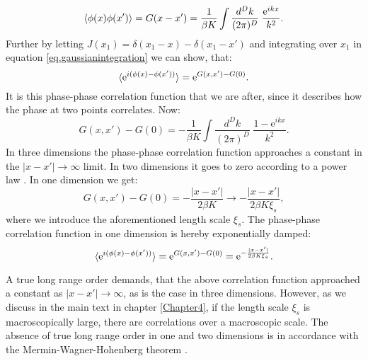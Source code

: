 \begin{equation}
\braket{\phi(x)\phi(x')} = G(x - x') = \frac{1}{\beta K}\int \frac{d^{D}k}{(2\pi)^D}\; \frac{\text{e}^{ikx}}{k^2}. 
\label{eq.anglecorrelationfunction.generaldimension}
\end{equation} 
Further by letting $J(x_1) = \delta(x_1 - x) - \delta(x_1 - x')$ and integrating over $x_1$ in equation \eqref{eq.gaussianintegration} we can show, that:
\begin{equation}
\braket{ \text{e}^{i(\phi(x)- \phi(x'))} } = \text{e}^{G(x,x') - G(0)}. 
\label{eq.phasecorrelationfunction.generaldimension} 
\end{equation}
It is this phase-phase correlation function that we are after, since it describes how the phase at two points correlates. Now:
\begin{equation}
G(x,x') - G(0) = -\frac{1}{\beta K}\int \frac{d^{D}k}{(2\pi)^D}\; \frac{1 - \text{e}^{ikx}}{k^2}. \nonumber
\end{equation}
In three dimensions the phase-phase correlation function approaches a constant in the $|x - x'| \to \infty$ limit. In two dimensions it goes to zero according to a power law \cite[p. 115]{Cardy.StatPhys}. In one dimension we get: 
\begin{equation}
G(x,x') - G(0) = -\frac{|x - x'|}{2\beta K}  \to -\frac{|x - x'|}{2\beta K \xi_s},  
\end{equation}
where we introduce the aforementioned length scale $\xi_s$. The phase-phase correlation function in one dimension is hereby exponentially damped:
\begin{equation}
\braket{ \text{e}^{i(\phi(x)- \phi(x'))} } = \text{e}^{G(x,x') - G(0)} = \text{e}^{-\frac{|x - x'|}{2\beta K \xi_s}}. 
\label{eq.phasecorrelationfunction.onedimension} 
\end{equation}

A true long range order demands, that the above correlation function approached a constant as $|x - x'| \to \infty$, as is the case in three dimensions. However, as we discuss in the main text in chapter \ref{Chapter4}, if the length scale $\xi_s$ is macroscopically large, there are correlations over a macroscopic scale. The absence of true long range order in one and two dimensions is in accordance with the Mermin-Wagner-Hohenberg theorem \cite{Hohenberg.MerminWagnertheorem}. 

